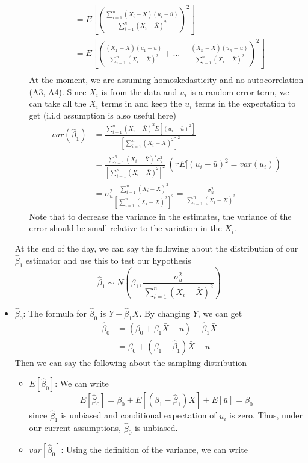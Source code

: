 \begin{itemize}
\begin{itemize}
\[\begin{aligned}
&=E\left[\left( \frac{\sum_{i=1}^n(X_i-\bar{X})(u_i-\bar{u})}{\sum_{i=1}^n(X_i-\bar{X})^2} \right)^2\right]\\
&=E\left[\left(  \frac{(X_1-\bar{X})(u_1-\bar{u})}{\sum_{i=1}^n(X_i-\bar{X})^2}+...+\frac{(X_n-\bar{X})(u_n-\bar{u})}{\sum_{i=1}^n(X_i-\bar{X})^2} \right)^2\right]\\
\end{aligned}
\]
At the moment, we are assuming homoskedasticity and no autocorrelation (A3, A4). Since $X_i$ is from the data and $u_i$ is a random error term, we can take all the $X_i$ terms in and keep the $u_i$ terms in the expectation to get (i.i.d assumption is also useful here)
\[
\begin{aligned}
var(\hat{\beta}_1)&=\frac{\sum_{i=1}^n(X_i-\bar{X})^2E[(u_i-\bar{u})^2]}{[\sum_{i=1}^n(X_i-\bar{X})^2]^2}\\
&=\frac{\sum_{i=1}^n(X_i-\bar{X})^2\sigma_u^2}{[\sum_{i=1}^n(X_i-\bar{X})^2]^2} \ (\because E[(u_i-\bar{u})^2=var(u_i))\\
&=\sigma_u^2\frac{\sum_{i=1}^n(X_i-\bar{X})^2}{[\sum_{i=1}^n(X_i-\bar{X})^2]^2} =\frac{\sigma_u^2}{\sum_{i=1}^n(X_i-\bar{X})^2}
\end{aligned}
\]
Note that  to decrease the variance in the estimates, the variance of the error should be small relative to the variation in the $X_i$. 
\end{itemize}
At the end of the day, we can say the following about the distribution of our $\hat{\beta}_1$ estimator and use this to test our hypothesis
\[
\hat{\beta}_1 \sim N\left(\beta_1, \frac{\sigma_u^2}{\sum_{i=1}^n(X_i-\bar{X})^2}\right)
\]
\item $\hat{\beta}_0$: The formula for $\hat{\beta}_0$ is $\bar{Y}-\hat{\beta}_1\bar{X}$. By changing $\bar{Y}$, we can get
\[
\begin{aligned}
\hat{\beta}_0&=(\beta_0+\beta_1\bar{X}+\bar{u})-\hat{\beta}_1\bar{X}\\
&=\beta_0+(\beta_1-\hat{\beta}_1)\bar{X}+\bar{u}
\end{aligned}
\]
Then we can say the following about the sampling distribution
\begin{itemize}
\item $E[\hat{\beta}_0]$: We can write
\[
E[\hat{\beta}_0]=\beta_0+E[(\beta_1-\hat{\beta}_1)\bar{X}]+E[\bar{u}]=\beta_0
\]
since $\hat{\beta}_1$ is unbiased and conditional expectation of $u_i$ is zero. Thus, under our current assumptions, $\hat{\beta}_0$ is unbiased. 
\item $var[\hat{\beta}_0]$: Using the definition of the variance, we can write \[
\]
\end{itemize}
\end{itemize}
